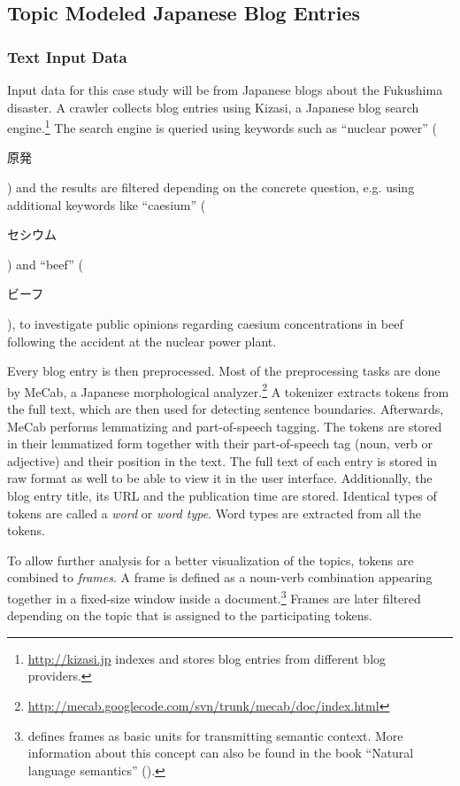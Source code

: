 \subsection{Topic Modeled Japanese Blog Entries}

\subsubsection{Text Input Data}

Input data for this case study will be from Japanese blogs about the Fukushima disaster. A crawler collects blog entries using Kizasi, a Japanese blog search engine.\footnote{\url{http://kizasi.jp} indexes and stores blog entries from different blog providers.} The search engine is queried using keywords such as ``nuclear power'' (\begin{CJK}{UTF8}{}原発\end{CJK}) and the results are filtered depending on the concrete question, e.g. using additional keywords like ``caesium'' (\begin{CJK}{UTF8}{}セシウム\end{CJK}) and ``beef'' (\begin{CJK}{UTF8}{}ビーフ\end{CJK}), to investigate public opinions regarding caesium concentrations in beef following the accident at the nuclear power plant.

Every blog entry is then preprocessed. Most of the preprocessing tasks are done by MeCab, a Japanese morphological analyzer.\footnote{\url{http://mecab.googlecode.com/svn/trunk/mecab/doc/index.html}} A tokenizer extracts tokens from the full text, which are then used for detecting sentence boundaries. Afterwards, MeCab performs lemmatizing and part-of-speech tagging. The tokens are stored in their lemmatized form together with their part-of-speech tag (noun, verb or adjective) and their position in the text. The full text of each entry is stored in raw format as well to be able to view it in the user interface. Additionally, the blog entry title, its URL and the publication time are stored. Identical types of tokens are called a \emph{word} or \emph{word type}. Word types are extracted from all the tokens.

To allow further analysis for a better visualization of the topics, tokens are combined to \emph{frames}. A frame is defined as a noun-verb combination appearing together in a fixed-size window inside a document.\footnote{\textcite{minsky1977frame} defines frames as basic units for transmitting semantic context. More information about this concept can also be found in the book ``Natural language semantics'' (\cite{allan2001natural}).} Frames are later filtered depending on the topic that is assigned to the participating tokens.

